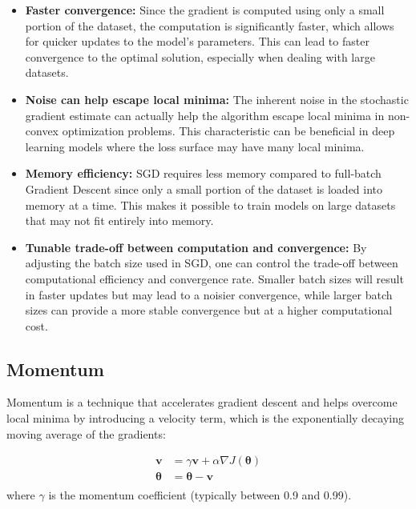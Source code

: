 \documentclass[12pt]{article}
\begin{document}
\begin{itemize}
\item \textbf{Faster convergence:} Since the gradient is computed using only a small portion of the dataset, the computation is significantly faster, which allows for quicker updates to the model's parameters. This can lead to faster convergence to the optimal solution, especially when dealing with large datasets.

\item \textbf{Noise can help escape local minima:} The inherent noise in the stochastic gradient estimate can actually help the algorithm escape local minima in non-convex optimization problems. This characteristic can be beneficial in deep learning models where the loss surface may have many local minima.

\item \textbf{Memory efficiency:} SGD requires less memory compared to full-batch Gradient Descent since only a small portion of the dataset is loaded into memory at a time. This makes it possible to train models on large datasets that may not fit entirely into memory.

\item \textbf{Tunable trade-off between computation and convergence:} By adjusting the batch size used in SGD, one can control the trade-off between computational efficiency and convergence rate. Smaller batch sizes will result in faster updates but may lead to a noisier convergence, while larger batch sizes can provide a more stable convergence but at a higher computational cost.
\end{itemize}


\subsection{Momentum}

Momentum is a technique that accelerates gradient descent and helps overcome local minima by introducing a velocity term, which is the exponentially decaying moving average of the gradients:

\begin{align*}
\mathbf{v} &= \gamma \mathbf{v} + \alpha \nabla J(\boldsymbol{\theta}) \\
\boldsymbol{\theta} &= \boldsymbol{\theta} - \mathbf{v}\\
\end{align*}
where $\gamma$ is the momentum coefficient (typically between 0.9 and 0.99).
\end{document}
